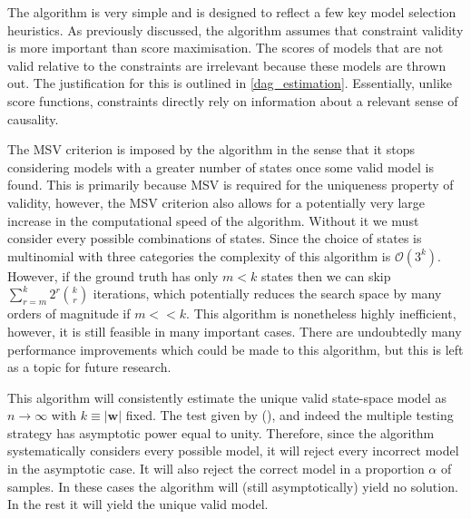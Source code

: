 \documentclass{article}
\begin{document}
The algorithm is very simple and is designed to reflect a few key model selection heuristics. As previously discussed, the algorithm assumes that constraint validity is more important than score maximisation. The scores of models that are not valid relative to the constraints are irrelevant because these models are thrown out. The justification for this is outlined in \ref{dag_estimation}. Essentially, unlike score functions, constraints directly rely on information about a relevant sense of causality.

The MSV criterion is imposed by the algorithm in the sense that it stops considering models with a greater number of states once some valid model is found. This is primarily because MSV is required for the uniqueness property of validity, however, the MSV criterion also allows for a potentially very large increase in the computational speed of the algorithm. Without it we must consider every possible combinations of states. Since the choice of states is multinomial with three categories the complexity of this algorithm is $\mathcal{O}(3^k)$. However, if the ground truth has only $m < k$ states then we can skip $\sum_{r=m}^{k} 2^r {\binom{k}{r}}$ iterations, which potentially reduces the search space by many orders of magnitude if $m << k$. This algorithm is nonetheless highly inefficient, however, it is still feasible in many important cases. There are undoubtedly many performance improvements which could be made to this algorithm, but this is left as a topic for future research.

This algorithm will consistently estimate the unique valid state-space model as $n \rightarrow \infty$ with $k \equiv |\mathbf{w}|$ fixed. The test given by \citeauthor{srivastava2005some} (\citeyear{srivastava2005some}), and indeed the multiple testing strategy has asymptotic power equal to unity. Therefore, since the algorithm systematically considers every possible model, it will reject every incorrect model in the asymptotic case. It will also reject the correct model in a proportion $\alpha$ of samples. In these cases the algorithm will (still asymptotically) yield no solution. In the rest it will yield the unique valid model. 
\end{document}
